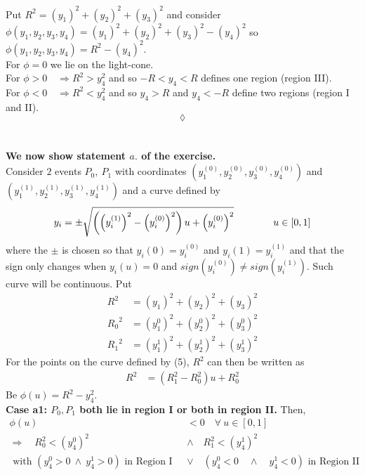 Put $R^2 = (y_1)^2+(y_2)^2+(y_3)^2$ and consider $\phi(y_1,y_2,y_3,y_4)= (y_1)^2+(y_2)^2+(y_3)^2-(y_4)^2$ so $\phi(y_1,y_2,y_3,y_4)= R^2-(y_4)^2$.\\
For $\phi=0$ we lie on the light-cone.\\
For $\phi>0 \quad\Rightarrow R^2 > y_4^2$ and so $-R<y_4<R$ defines one region (region III).\\
For $\phi<0 \quad\Rightarrow R^2 < y_4^2$ and so   $y_4>R$ and $y_4<-R$ define two  regions (region I and II).\\$$\lozenge$$\\\\
\textbf{We now show statement $\mathit{a.}$ of the exercise.}\\
Consider $2$ events $P_0,\ P_1$ with coordinates $(y_1^{(0)},y_2^{(0)},y_3^{(0)},y_4^{(0)})$ and $(y_1^{(1)},y_2^{(1)},y_3^{(1)},y_4^{(1)})$  and a curve defined by 
\begin{align}y_i= \pm\sqrt{\left(\left(y_i^{(1)}\right)^2-\left(y_i^{(0)}\right)^2\right)u + \left(y_i^{(0)}\right)^2}\quad\quad\quad\quad u\in \left[0,1\right]
\end{align}
where the $\pm$ is chosen so that $y_i(0) = y_i^{(0)}$ and $y_i(1) = y_i^{(1)}$ and that the sign only changes when $y_i(u)=0$ and $sign\left(y_i^{(0)}\right) \neq sign\left(y_i^{(1)}\right)$. Such curve will be continuous.
Put
\begin{align}
R^2&= \left(y_1\right)^2+\left(y_2\right)^2+\left(y_3\right)^2\\
{R_{0}}^2&= \left(y^0_1\right)^2+\left(y^0_2\right)^2+\left(y^0_3\right)^2\\
{R_{1}}^2&= \left(y^1_1\right)^2+\left(y^1_2\right)^2+\left(y^1_3\right)^2
\end{align}
For the points on the curve defined by  (5), $R^2$ can then be written as 
\begin{align}
R^2&= \left(R_1^2-R_0^2\right)u+R_0^2
\end{align}
Be $\phi(u)= R^2-y_4^2$.\\
\textbf{Case a1: $P_0, P_1$ both lie in region I or both in region II.} Then,\\
\begin{align}
\phi(u) & < 0\quad \forall \ u\in \left[0,1\right]\\
\Rightarrow\quad R_0^2 < (y_4^{0})^2 \quad &\wedge \quad  R_1^2 < (y_4^{1})^2 \\ \text{ with }   (y_4^{0}>0 \  \wedge \ y_4^{1}>0)\text{ in Region I}\quad &\vee \quad (y_4^{0}<0\quad \wedge \quad y_4^{1}<0)  \text{ in Region II}
\end{align}
